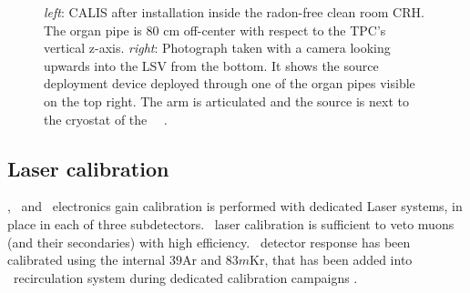\begin{figure}[htbp]
 \centering
{}
\caption{\textit{left}: CALIS after installation inside the radon-free clean room CRH. The organ pipe is 80 cm off-center with respect to the TPC's vertical z-axis. \textit{right}: Photograph taken with a camera looking upwards into the LSV from the bottom. It shows the source deployment device deployed through one of the organ pipes visible on the top right. The arm is articulated and the source is next to the cryostat of the \lar\ \tpc\ \cite{Agnes:2015qyz}.
\label{fig:CALIS_photos}}
\end{figure}

\subsection*{Laser calibration}
\wcv, \lsv\ and \tpc\ electronics gain calibration is performed with dedicated Laser systems, in place in each of three subdetectors. \wcv\ laser calibration is sufficient to veto muons (and their secondaries) with high efficiency. \tpc\ detector response has been calibrated using the internal ${39}$Ar and $83m$Kr, that has been added into \lar\ recirculation system during dedicated calibration campaigns \cite{Agnes:2015gu}.







